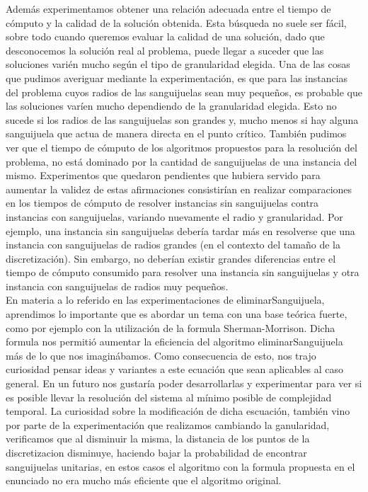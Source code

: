 Además experimentamos obtener una relación adecuada entre el tiempo de cómputo y la calidad de la solución obtenida. Esta búsqueda no suele ser fácil, sobre todo cuando queremos evaluar la calidad de una solución, dado que desconocemos la solución real al problema, puede llegar a suceder que las soluciones varién mucho según el tipo de granularidad elegida. Una de las cosas que pudimos averiguar mediante la experimentación, es que para las instancias del problema cuyos radios de las sanguijuelas sean muy pequeños, es probable que las soluciones varíen mucho dependiendo de la granularidad elegida. Esto no sucede si los radios de las sanguijuelas son grandes y, mucho menos si hay alguna sanguijuela que actua de manera directa en el punto crítico. También pudimos ver que el tiempo de cómputo de los algoritmos propuestos para la resolución del problema, no está dominado por la cantidad de sanguijuelas de una instancia del mismo. Experimentos que quedaron pendientes que hubiera servido para aumentar la validez de estas afirmaciones consistirían en realizar comparaciones en los tiempos de cómputo de resolver instancias sin sanguijuelas contra instancias con sanguijuelas, variando nuevamente el radio y granularidad. Por ejemplo, una instancia sin sanguijuelas debería tardar más en resolverse que una instancia con sanguijuelas de radios grandes (en el contexto del tamaño de la discretización). Sin embargo, no deberían existir grandes diferencias entre el tiempo de cómputo consumido para resolver una instancia sin sanguijuelas y otra instancia con sanguijuelas de radios muy pequeños.\\
En materia a lo referido en las experimentaciones de eliminarSanguijuela, aprendimos lo importante que es abordar un tema con una base teórica fuerte, como por ejemplo con la utilización de la formula Sherman-Morrison. Dicha formula nos permitió aumentar la eficiencia del algoritmo eliminarSanguijuela más de lo que nos imaginábamos. Como consecuencia de esto, nos trajo curiosidad pensar ideas y variantes a este ecuación que sean aplicables al caso general. En un futuro nos gustaría poder desarrollarlas y experimentar para ver si es posible llevar la resolución del sistema al mínimo posible de complejidad temporal. La curiosidad sobre la modificación de dicha escuación, también vino por parte de la experimentación que realizamos cambiando la ganularidad, verificamos que al disminuir la misma, la distancia de los puntos de la discretizacion disminuye, haciendo bajar la probabilidad de encontrar sanguijuelas unitarias, en estos casos el algoritmo con la formula propuesta en el enunciado no era mucho más eficiente que el algoritmo original.
